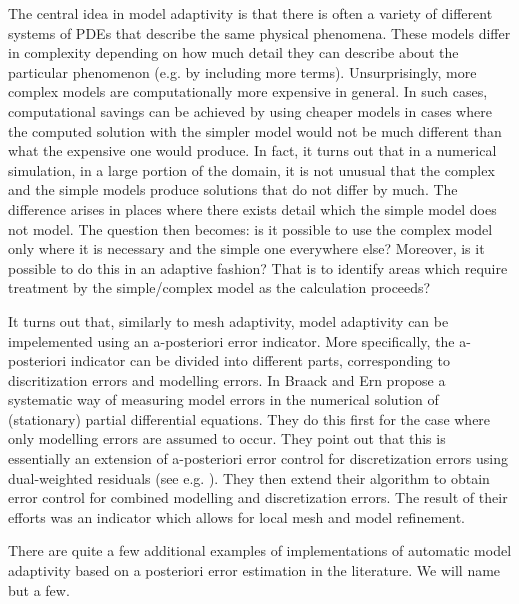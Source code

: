 \documentclass[12pt,a4paper]{article}
\theoremstyle{definition}
\begin{document}
The central idea in model adaptivity is that there is often a variety of different systems of PDEs that describe the same physical phenomena.  These models differ in complexity depending on how much detail they can describe about the particular phenomenon (e.g. by including more terms).  Unsurprisingly, more complex models are computationally more expensive in general.   In such cases, computational savings can be achieved by using cheaper models in cases where the computed solution with the simpler model would not be much different than what the expensive one would produce.   In fact, it turns out that in a numerical simulation, in a large portion of the domain, it is not unusual that the complex and the simple models produce solutions that do not differ by much.  The difference arises in places where there exists detail which the simple model does not model. The question then becomes: is it possible to use the complex model only where it is necessary and the simple one everywhere else?  Moreover, is it possible to do this in an adaptive fashion?  That is to identify areas which require treatment by the simple/complex model as the calculation proceeds?

It turns out that, similarly to mesh adaptivity, model adaptivity can be impelemented using an a-posteriori error indicator.  More specifically, the a-posteriori indicator can be divided into different parts, corresponding to discritization errors and modelling errors.  In \cite{braack2003posteriori} Braack and Ern propose a systematic way of measuring model errors in the numerical solution of (stationary) partial differential equations.   They do this first for the case where only modelling errors are assumed to occur.  They point out that this is essentially an extension of a-posteriori error control for discretization errors using dual-weighted residuals (see e.g. \cite{becker2001optimal}). They then extend their algorithm to obtain error control for combined modelling and discretization errors.  The result of their efforts was an indicator which allows for local mesh and model refinement.

There are quite a few additional examples of implementations of automatic model adaptivity based on a posteriori error estimation in the literature.  We will name but a few.
  
\end{document}
